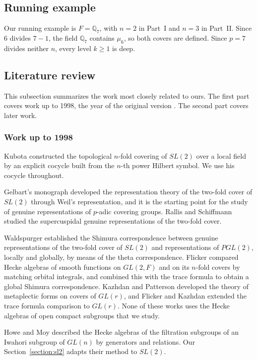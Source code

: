 \documentclass[12pt,letterpaper]{amsart}
\numberwithin{equation}{section}
\theoremstyle{definition}
\theoremstyle{remark}
\begin{document}
\subsection{Running example}
Our running example is $F=\mathbb{Q}_7$, with $n=2$ in Part~I and $n=3$
in Part~II. Since $6$ divides $7-1$, the field $\mathbb{Q}_7$ contains
$\mu_6$, so both covers are defined. Since $p=7$ divides neither $n$,
every level $k\geq 1$ is deep.

\subsection{Literature review}
\label{section:lit}

This subsection summarizes the work most closely related to ours. The
first part covers work up to 1998, the year of the original version
\cite{Jo98}. The second part covers later work.

\subsubsection{Work up to 1998}
Kubota \cite{Ku67} constructed the topological $n$-fold covering of
$SL(2)$ over a local field by an explicit cocycle built from the
$n$-th power Hilbert symbol. We use his cocycle throughout.

Gelbart's monograph \cite{Ge76} developed the representation theory
of the two-fold cover of $SL(2)$ through Weil's representation, and it
is the starting point for the study of genuine representations of
$p$-adic covering groups. Rallis and Schiffmann \cite{RS77} studied
the supercuspidal genuine representations of the two-fold cover.

Waldspurger \cite{Wa80} established the Shimura correspondence between
genuine representations of the two-fold cover of $SL(2)$ and
representations of $PGL(2)$, locally and globally, by means of the
theta correspondence. Flicker \cite{Fl80} compared Hecke algebras of
smooth functions on $GL(2,F)$ and on its $n$-fold covers by matching
orbital integrals, and combined this with the trace formula to obtain
a global Shimura correspondence. Kazhdan and Patterson \cite{KP84}
developed the theory of metaplectic forms on covers of $GL(r)$, and
Flicker and Kazhdan \cite{FK86} extended the trace formula comparison
to $GL(r)$. None of these works uses the Hecke algebras of open compact
subgroups that we study.

Howe and Moy \cite{HM85} described the Hecke algebras of the
filtration subgroups of an Iwahori subgroup of $GL(n)$ by generators
and relations. Our Section~\ref{section:sl2} adapts their method to
$SL(2)$.
\end{document}
